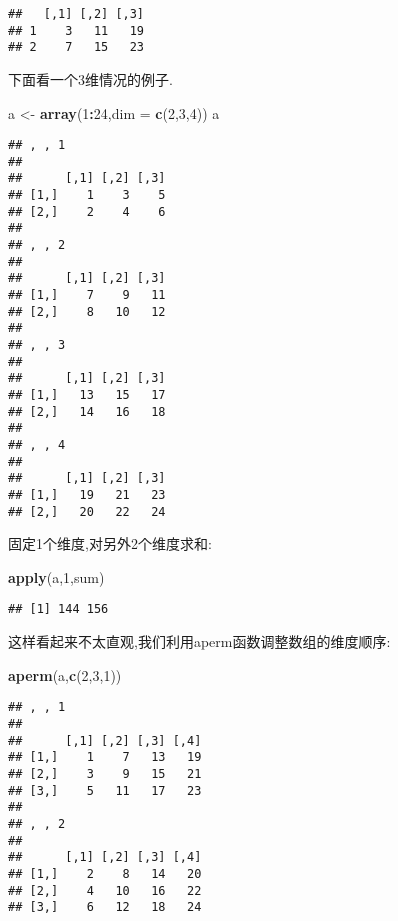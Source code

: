 \documentclass[]{ctexbook}
\newenvironment{Shaded}{\begin{snugshade}}{\end{snugshade}}
\newcommand{\DataTypeTok}[1]{\textcolor[rgb]{0.13,0.29,0.53}{#1}}
\newcommand{\DecValTok}[1]{\textcolor[rgb]{0.00,0.00,0.81}{#1}}
\newcommand{\KeywordTok}[1]{\textcolor[rgb]{0.13,0.29,0.53}{\textbf{#1}}}
\newcommand{\NormalTok}[1]{#1}
\newcommand{\OperatorTok}[1]{\textcolor[rgb]{0.81,0.36,0.00}{\textbf{#1}}}
\newcommand{\StringTok}[1]{\textcolor[rgb]{0.31,0.60,0.02}{#1}}
\begin{document}
\begin{verbatim}
##   [,1] [,2] [,3]
## 1    3   11   19
## 2    7   15   23
\end{verbatim}

下面看一个3维情况的例子.

\begin{Shaded}
\begin{Highlighting}[]
\NormalTok{a <-}\StringTok{ }\KeywordTok{array}\NormalTok{(}\DecValTok{1}\OperatorTok{:}\DecValTok{24}\NormalTok{,}\DataTypeTok{dim =} \KeywordTok{c}\NormalTok{(}\DecValTok{2}\NormalTok{,}\DecValTok{3}\NormalTok{,}\DecValTok{4}\NormalTok{))}
\NormalTok{a}
\end{Highlighting}
\end{Shaded}

\begin{verbatim}
## , , 1
## 
##      [,1] [,2] [,3]
## [1,]    1    3    5
## [2,]    2    4    6
## 
## , , 2
## 
##      [,1] [,2] [,3]
## [1,]    7    9   11
## [2,]    8   10   12
## 
## , , 3
## 
##      [,1] [,2] [,3]
## [1,]   13   15   17
## [2,]   14   16   18
## 
## , , 4
## 
##      [,1] [,2] [,3]
## [1,]   19   21   23
## [2,]   20   22   24
\end{verbatim}

固定1个维度,对另外2个维度求和:

\begin{Shaded}
\begin{Highlighting}[]
\KeywordTok{apply}\NormalTok{(a,}\DecValTok{1}\NormalTok{,sum)}
\end{Highlighting}
\end{Shaded}

\begin{verbatim}
## [1] 144 156
\end{verbatim}

这样看起来不太直观,我们利用aperm函数调整数组的维度顺序:

\begin{Shaded}
\begin{Highlighting}[]
\KeywordTok{aperm}\NormalTok{(a,}\KeywordTok{c}\NormalTok{(}\DecValTok{2}\NormalTok{,}\DecValTok{3}\NormalTok{,}\DecValTok{1}\NormalTok{))}
\end{Highlighting}
\end{Shaded}

\begin{verbatim}
## , , 1
## 
##      [,1] [,2] [,3] [,4]
## [1,]    1    7   13   19
## [2,]    3    9   15   21
## [3,]    5   11   17   23
## 
## , , 2
## 
##      [,1] [,2] [,3] [,4]
## [1,]    2    8   14   20
## [2,]    4   10   16   22
## [3,]    6   12   18   24
\end{verbatim}
\end{document}
